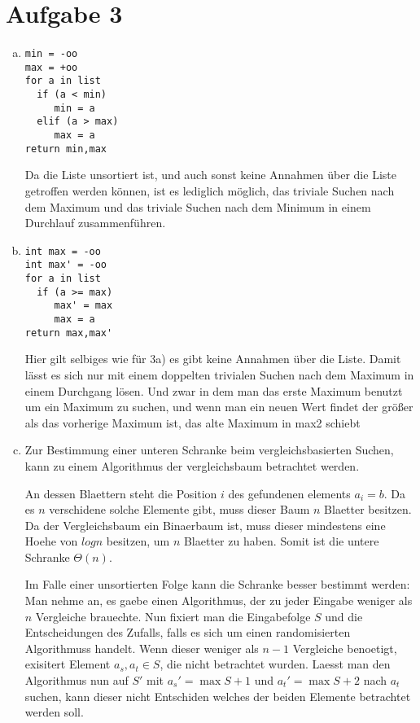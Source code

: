 \section*{Aufgabe 3}
\begin{enumerate}[(a)]
\item 
\begin{verbatim}
min = -oo
max = +oo
for a in list
  if (a < min)
     min = a
  elif (a > max)
     max = a
return min,max
\end{verbatim}

Da die Liste unsortiert ist, und auch sonst keine Annahmen über die Liste
getroffen werden können, ist es lediglich möglich, das triviale Suchen nach dem
Maximum und das triviale Suchen nach dem Minimum in einem Durchlauf
zusammenführen.

\item
\begin{verbatim}
int max = -oo
int max' = -oo
for a in list
  if (a >= max)
     max' = max
     max = a
return max,max'
\end{verbatim}

Hier gilt selbiges wie für 3a) es gibt keine Annahmen über die Liste. Damit
lässt es sich nur mit einem doppelten trivialen Suchen nach dem Maximum in
einem Durchgang lösen. Und zwar in dem man das erste Maximum benutzt um ein
Maximum zu suchen, und wenn man ein neuen Wert findet der größer als das
vorherige Maximum ist, das alte Maximum in max2 schiebt

\item

Zur Bestimmung einer unteren Schranke beim vergleichsbasierten Suchen, 
kann zu einem Algorithmus der vergleichsbaum betrachtet werden.

An dessen Blaettern steht die Position $i$ des gefundenen elements $a_i = b$.
Da es $n$ verschidene solche Elemente gibt, muss dieser Baum $n$ Blaetter besitzen.
Da der Vergleichsbaum ein Binaerbaum ist, muss dieser mindestens eine Hoehe von $log n$ besitzen,
um $n$ Blaetter zu haben. Somit ist die untere Schranke $\Theta(n)$.

Im Falle einer unsortierten Folge kann die Schranke besser bestimmt werden: 
Man nehme an, es gaebe einen Algorithmus, der zu jeder Eingabe weniger als $n$ Vergleiche brauechte.
Nun fixiert man die Eingabefolge $S$ und die Entscheidungen des Zufalls, falls es sich um einen randomisierten Algorithmuss
handelt. Wenn dieser weniger als $n-1$ Vergleiche benoetigt, exisitert Element $a_s,a_t \in S$, die nicht
betrachtet wurden. Laesst man den Algorithmus nun auf $S'$ mit $a_s' = \max S + 1$ und $a_t' = \max S + 2$ nach 
$a_t$ suchen, kann dieser nicht Entschiden welches der beiden Elemente betrachtet werden soll.

\end{enumerate}


